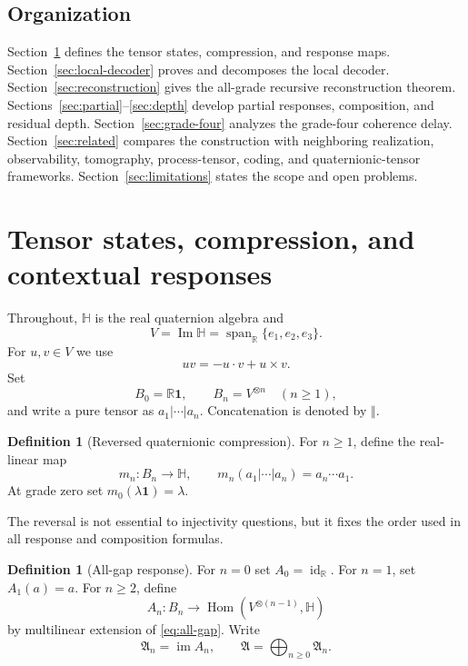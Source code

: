 \documentclass[11pt]{article}
\theoremstyle{definition}
\newtheorem{definition}[theorem]{Definition}
\theoremstyle{remark}
\newcommand{\R}{\mathbb R}
\newcommand{\Hq}{\mathbb H}
\newcommand{\Aresp}{\mathfrak A}
\newcommand{\Hom}{\operatorname{Hom}}
\newcommand{\im}{\operatorname{im}}
\newcommand{\id}{\operatorname{id}}
\newcommand{\Span}{\operatorname{span}}
\newcommand{\concat}{\mathbin{\Vert}}
\begin{document}
\subsection{Organization}

Section~\ref{sec:setup} defines the tensor states, compression, and response maps.  Section~\ref{sec:local-decoder} proves and decomposes the local decoder.  Section~\ref{sec:reconstruction} gives the all-grade recursive reconstruction theorem.  Sections~\ref{sec:partial}--\ref{sec:depth} develop partial responses, composition, and residual depth.  Section~\ref{sec:grade-four} analyzes the grade-four coherence delay.  Section~\ref{sec:related} compares the construction with neighboring realization, observability, tomography, process-tensor, coding, and quaternionic-tensor frameworks.  Section~\ref{sec:limitations} states the scope and open problems.

\section{Tensor states, compression, and contextual responses}\label{sec:setup}

Throughout, $\Hq$ is the real quaternion algebra and
\[
  V=\operatorname{Im}\Hq=\Span_{\R}\{e_1,e_2,e_3\}.
\]
For $u,v\in V$ we use
\begin{equation}\label{eq:qproduct}
  uv=-u\cdot v+u\times v.
\end{equation}
Set
\[
  B_0=\R\mathbf 1,\qquad B_n=V^{\otimes n}\quad(n\ge 1),
\]
and write a pure tensor as $a_1|\cdots|a_n$.  Concatenation is denoted by $\concat$.

\begin{definition}[Reversed quaternionic compression]
For $n\ge 1$, define the real-linear map
\[
  m_n:B_n\to\Hq,
  \qquad
  m_n(a_1|\cdots|a_n)=a_n\cdots a_1.
\]
At grade zero set $m_0(\lambda\mathbf 1)=\lambda$.
\end{definition}

The reversal is not essential to injectivity questions, but it fixes the order used in all response and composition formulas.

\begin{definition}[All-gap response]
For $n=0$ set $A_0=\id_{\R}$.  For $n=1$, set $A_1(a)=a$.  For $n\ge 2$, define
\[
  A_n:B_n\longrightarrow \Hom(V^{\otimes(n-1)},\Hq)
\]
by multilinear extension of \eqref{eq:all-gap}.  Write
\[
  \Aresp_n=\im A_n,
  \qquad
  \Aresp=\bigoplus_{n\ge 0}\Aresp_n.
\]
\end{definition}
\end{document}
